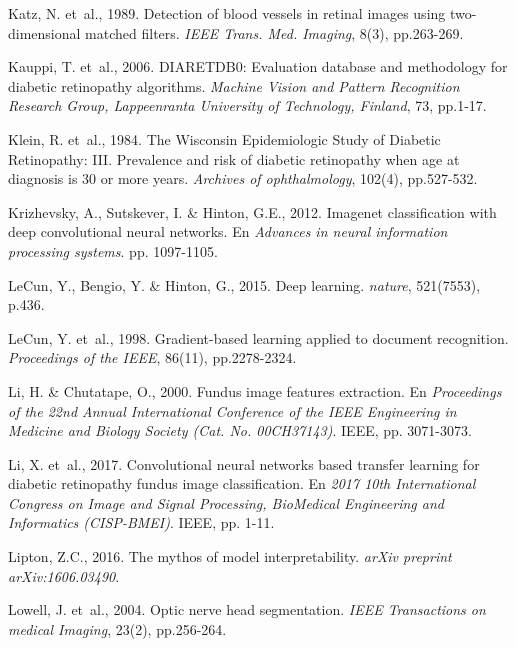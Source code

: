 \documentclass[
  12pt,
  spanish,
  a4paperpaper,
]{report}
\begin{document}
\leavevmode\hypertarget{ref-katz1989detection}{}%
Katz, N. et~al., 1989. Detection of blood vessels in retinal images
using two-dimensional matched filters. \emph{IEEE Trans. Med. Imaging},
8(3), pp.263-269.

\leavevmode\hypertarget{ref-kauppi2006diaretdb0}{}%
Kauppi, T. et~al., 2006. DIARETDB0: Evaluation database and methodology
for diabetic retinopathy algorithms. \emph{Machine Vision and Pattern
Recognition Research Group, Lappeenranta University of Technology,
Finland}, 73, pp.1-17.

\leavevmode\hypertarget{ref-klein1984wisconsin}{}%
Klein, R. et~al., 1984. The Wisconsin Epidemiologic Study of Diabetic
Retinopathy: III. Prevalence and risk of diabetic retinopathy when age
at diagnosis is 30 or more years. \emph{Archives of ophthalmology},
102(4), pp.527-532.

\leavevmode\hypertarget{ref-krizhevsky2012imagenet}{}%
Krizhevsky, A., Sutskever, I. \& Hinton, G.E., 2012. Imagenet
classification with deep convolutional neural networks. En
\emph{Advances in neural information processing systems}. pp. 1097-1105.

\leavevmode\hypertarget{ref-lecun2015deep}{}%
LeCun, Y., Bengio, Y. \& Hinton, G., 2015. Deep learning. \emph{nature},
521(7553), p.436.

\leavevmode\hypertarget{ref-lecun1998gradient}{}%
LeCun, Y. et~al., 1998. Gradient-based learning applied to document
recognition. \emph{Proceedings of the IEEE}, 86(11), pp.2278-2324.

\leavevmode\hypertarget{ref-li2000fundus}{}%
Li, H. \& Chutatape, O., 2000. Fundus image features extraction. En
\emph{Proceedings of the 22nd Annual International Conference of the
IEEE Engineering in Medicine and Biology Society (Cat. No. 00CH37143)}.
IEEE, pp. 3071-3073.

\leavevmode\hypertarget{ref-li2017convolutional}{}%
Li, X. et~al., 2017. Convolutional neural networks based transfer
learning for diabetic retinopathy fundus image classification. En
\emph{2017 10th International Congress on Image and Signal Processing,
BioMedical Engineering and Informatics (CISP-BMEI)}. IEEE, pp. 1-11.

\leavevmode\hypertarget{ref-lipton2016mythos}{}%
Lipton, Z.C., 2016. The mythos of model interpretability. \emph{arXiv
preprint arXiv:1606.03490}.

\leavevmode\hypertarget{ref-lowell2004optic}{}%
Lowell, J. et~al., 2004. Optic nerve head segmentation. \emph{IEEE
Transactions on medical Imaging}, 23(2), pp.256-264.
\end{document}

